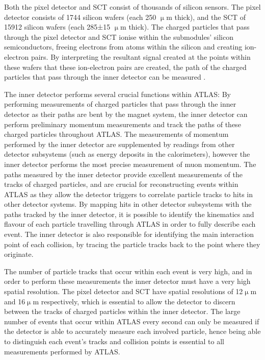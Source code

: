 \documentclass[12pt,a4paper,epsf,portrait,times,epsfig]{article}
\begin{document}
		Both the pixel detector and SCT consist of thousands of silicon sensors. The pixel detector consists of 1744 silicon wafers (each 250 $\upmu$m thick), and the SCT of 15912 silicon wafers (each 285±15 $\upmu$m thick). The charged particles that pass through the pixel detector and SCT ionise within the submodules’ silicon semiconductors, freeing electrons from atoms within the silicon and creating ion-electron pairs. By interpreting the resultant signal created at the points within these wafers that these ion-electron pairs are created, the path of the charged particles that pass through the inner detector can be measured 
		\cite{ATLAS-TDR-01, ATLAS-TDR-02, Article:ATLASDesignPaper}.
		\par
		
		

		
		
		 The inner detector performs several crucial functions within ATLAS: By performing measurements of charged particles that pass through the inner detector as their paths are bent by the magnet system, the inner detector can perform preliminary momentum measurements and track the paths of these charged particles throughout ATLAS. The measurements of momentum performed by the inner detector are supplemented by readings from other detector subsystems (such as energy deposits in the calorimeters), however the inner detector performs the most precise measurement of muon momentum. The paths measured by the inner detector provide excellent measurements of the tracks of charged particles, and are crucial for reconstructing events within ATLAS as they allow the detector triggers to correlate particle tracks to hits in other detector systems. By mapping hits in other detector subsystems with the paths tracked by the inner detector, it is possible to identify the kinematics and flavour of each particle travelling through ATLAS in order to fully describe each event. The inner detector is also responsible	for identifying the main interaction point of each collision, by tracing the particle tracks back to the point where they originate. \par
		
		The number of particle tracks that occur within each event is very high, and in order to perform these measurements the inner detector must have a very high spatial resolution. The pixel detector and SCT have spatial resolutions of 12$\upmu$m and 16$\upmu$m respectively, which is	essential to allow the detector to discern between the tracks of charged particles within the
		inner detector. The large number of events that occur within ATLAS every second can only be measured if the detector is able to accurately measure each involved particle, hence being	able to distinguish each event’s tracks and collision points is essential to all measurements
		performed by ATLAS. \par
		
\end{document}
